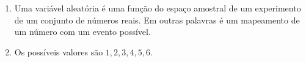 \item
\begin{enumerate}
  \item
  Uma variável aleatória é uma função do espaço amostral de um experimento de um conjunto de números reais.
  Em outras palavras é um mapeamento de um número com um evento possível.

  \item
  Os possíveis valores são ${1, 2, 3, 4, 5, 6}$.
\end{enumerate}
